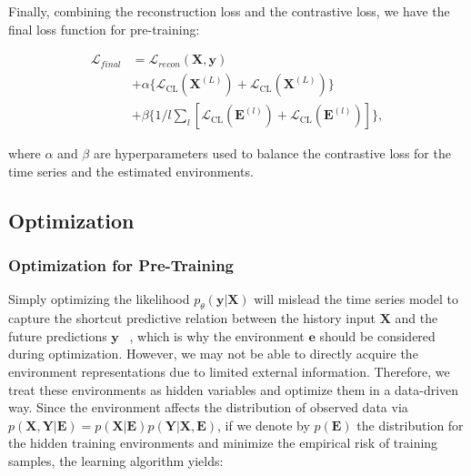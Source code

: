 

Finally, combining the reconstruction loss and the contrastive loss, we have the final loss function for pre-training:

{\small
\begin{align}
\mathcal{L}_{final} &= \mathcal{L}_{recon}(\mathbf{X}, \mathbf{y})  \nonumber \\
&+ \alpha \{\mathcal{L}_{\text{CL}}(\mathbf{X}^{(L)}) + \mathcal{L}_{\text{CL}}(\mathbf{X}^{(L)})\} \nonumber \\
&+ \beta \{ 1/l \sum_l [\mathcal{L}_{\text{CL}}(\mathbf{E}^{(l)}) + \mathcal{L}_{\text{CL}}(\mathbf{E}^{(l)})] \}, \tag{14}
\end{align}
}

where $\alpha$ and $\beta$ are hyperparameters used to balance the contrastive loss for the time series and the estimated environments.


\subsection{Optimization}
\subsubsection{Optimization for Pre-Training}

Simply optimizing the likelihood $p_\theta(\mathbf{y}|\mathbf{X})$ will mislead the time series model to capture the shortcut predictive relation between the history input $\mathbf{X}$ and the future predictions $\mathbf{y}$ ~\cite{wu2024graph}, which is why the environment $\mathbf{e}$ should be considered during optimization. However, we may not be able to directly acquire the environment representations due to limited external information. Therefore, we treat these environments as hidden variables and optimize them in a data-driven way. Since the environment affects the distribution of observed data via $p(\mathbf{X}, \mathbf{Y} |\mathbf{E}) = p (\mathbf{X} |\mathbf{E})p (\mathbf{Y} |\mathbf{X}, \mathbf{E})$, if we denote by $p(\mathbf{E})$ the distribution for the hidden training environments and minimize the empirical risk of training samples, the learning algorithm yields:

